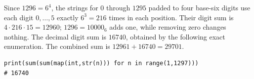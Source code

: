 Since $1296=6^4$, the strings for $0$ through $1295$ padded to four base-six digits use each digit $0,\ldots,5$ exactly $6^3=216$ times in each position. Their digit sum is $4\cdot216\cdot15=12960$; $1296=10000_6$ adds one, while removing zero changes nothing. The decimal digit sum is $16740$, obtained by the following exact enumeration. The combined sum is $\boxed{12961+16740=29701}$.
\begin{verbatim}
print(sum(sum(map(int,str(n))) for n in range(1,1297)))
# 16740
\end{verbatim}
